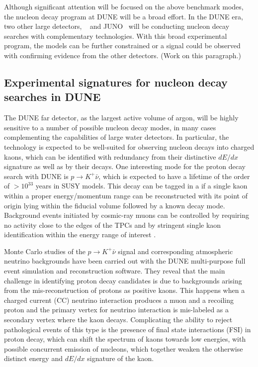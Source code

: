Although significant attention will be focused on the above benchmark modes, the nucleon decay program at DUNE will be a broad effort.  In the DUNE era, two other large detectors, \hyperk~\cite{Abe:2018uyc} and JUNO~\cite{Djurcic:2015vqa} will be conducting nucleon decay searches with complementary technologies.  With this broad experimental program, the models can be further constrained or a signal could be observed with confirming evidence from the other detectors. (Work on this paragraph.)


\subsection{Experimental signatures for nucleon decay searches in DUNE}
\label{subsec:nonaccel-ndk-dune}

The DUNE far detector, as the largest active volume of argon, 
will be highly sensitive to a number of possible nucleon decay modes, 
in many cases complementing the capabilities of large water detectors.  
In particular, the \lartpc technology is expected to be well-suited for observing 
nucleon decays into charged kaons, which can be identified with redundancy 
from their distinctive $dE/dx$ signature as well as by their decays.
One interesting mode for the proton decay search with DUNE is
$p\to K^+ \bar{\nu}$, which is expected to have a lifetime of the order of 
$>10^{33}$ years in SUSY models. This decay can be tagged in a \lartpc if a 
single kaon within a proper energy/momentum range can be reconstructed with 
its point of origin lying within the fiducial volume followed by a known decay mode. 
Background events initiated by cosmic-ray muons can be controlled  by requiring 
no activity close to the edges of the TPCs and by stringent single kaon identification 
within the energy range of interest \cite{fdtf-final,fdtf-interim}.

Monte Carlo studies of the $p\to K^+ \bar{\nu}$ signal and corresponding atmospheric neutrino backgrounds have been carried out with the DUNE multi-purpose full event simulation and reconstruction software.  They reveal that the main challenge in identifying proton decay candidates is due to backgrounds arising from the mis-reconstruction of protons as positive kaons. This happens when a charged current (CC) neutrino interaction produces a muon and a recoiling proton and the primary vertex for neutrino interaction is mis-labeled as a secondary vertex where the kaon decays.  Complicating the ability to reject pathological events of this type is the presence of final state interactions (FSI) in proton decay, which can shift the spectrum of kaons towards low energies, with possible concurrent emission of nucleons, which together weaken the otherwise distinct energy and $dE/dx$ signature of the kaon. 

